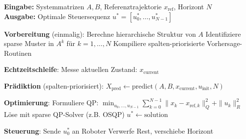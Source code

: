 ﻿\documentclass[a4paper,12pt]{report}
\theoremstyle{definition}
\begin{document}
	\begin{algorithm}[H]
		\caption{Strukturausnutzende MPC für Robotersteuerung}
		\label{alg:robot-mpc}
		\textbf{Eingabe:} Systemmatrizen $A, B$, Referenztrajektorie $x_{\text{ref}}$, Horizont $N$ \\
		\textbf{Ausgabe:} Optimale Steuersequenz $u^* = [u_0^*, \ldots, u_{N-1}^*]$
		\begin{algorithmic}[1]
			\State \textbf{Vorbereitung} (einmalig):
			\State Berechne hierarchische Struktur von $A$
			\State Identifiziere sparse Muster in $A^k$ für $k = 1, \ldots, N$
			\State Kompiliere spalten-priorisierte Vorhersage-Routinen
			
			\State \textbf{Echtzeitschleife}:
			\State Messe aktuellen Zustand: $x_{\text{current}}$
			
			\State \textbf{Prädiktion} (spalten-priorisiert):
			\State $X_{\text{pred}} \gets \text{predict}(A, B, x_{\text{current}}, u_{\text{init}}, N)$
			
			\State \textbf{Optimierung}:
			\State Formuliere QP: $\min_{u_0, \ldots, u_{N-1}} \sum_{k=0}^{N-1} \|x_k - x_{\text{ref},k}\|^2_Q + \|u_k\|^2_R$
			\State Löse mit sparse QP-Solver (z.B. OSQP)
			\State $u^* \gets \text{solution}$
			
			\State \textbf{Steuerung}:
			\State Sende $u_0^*$ an Roboter
			\State Verwerfe Rest, verschiebe Horizont
			\EndWhile
		\end{algorithmic}
	\end{algorithm}
	
\end{document}
